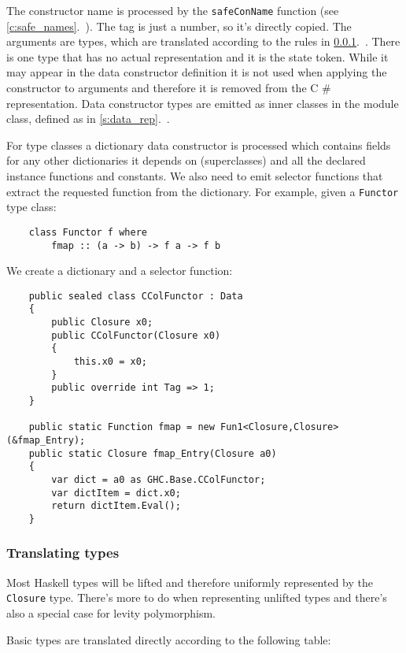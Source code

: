 \documentclass[en]{pracamgr}
\newcommand{\shrp}{%
  {\fontfamily{ppl}\selectfont\#%
  }}
\newcommand{\myref}[1]{\ref{#1}.~\textit{\nameref{#1}}}
\begin{document}
The constructor name is processed by the \texttt{safeConName}
function (see \myref{c:safe_names}). The tag is just a number,
so it's directly copied. The arguments are types, which are
translated according to the rules in \myref{c:typesToCs}. There is one type
that has no actual representation and it is the state token.
While it may appear in the data constructor definition it is not
used when applying the constructor to arguments and therefore
it is removed from the C\shrp{} representation.
Data constructor types are emitted as inner classes in the module class,
defined as in \myref{s:data_rep}.

For type classes a dictionary data constructor is processed which
contains fields for any other dictionaries it depends on (superclasses)
and all the declared instance functions and constants.
We also need to emit selector functions that extract the requested function
from the dictionary. For example, given a \texttt{Functor} type class:

\begin{verbatim}
    class Functor f where
        fmap :: (a -> b) -> f a -> f b
\end{verbatim}

We create a dictionary and a selector function:

\begin{verbatim}
    public sealed class CColFunctor : Data
    {
        public Closure x0;
        public CColFunctor(Closure x0)
        {
            this.x0 = x0;
        }
        public override int Tag => 1;
    }

    public static Function fmap = new Fun1<Closure,Closure>(&fmap_Entry);
    public static Closure fmap_Entry(Closure a0)
    {
        var dict = a0 as GHC.Base.CColFunctor;
        var dictItem = dict.x0;
        return dictItem.Eval();
    }
\end{verbatim}

\subsubsection{Translating types}\label{c:typesToCs}
Most Haskell types will be lifted and therefore uniformly represented
by the \texttt{Closure} type. There's more to do when representing
unlifted types and there's also a special case for levity polymorphism.

Basic types are translated directly according to the following table:
\end{document}
